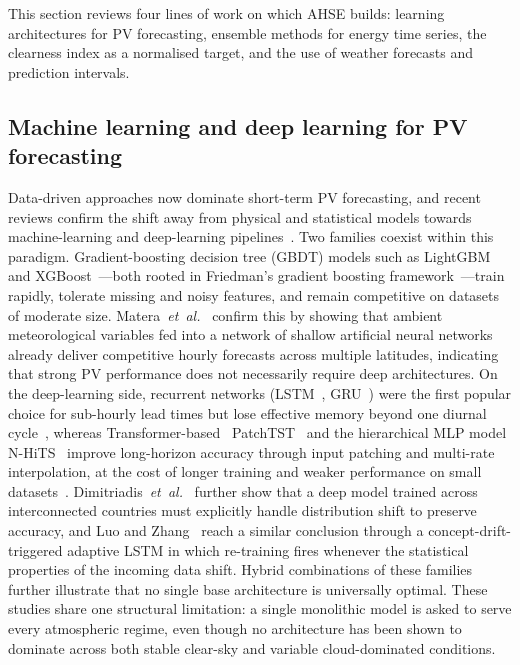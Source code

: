 
This section reviews four lines of work on which AHSE builds:
learning architectures for PV forecasting, ensemble methods for energy
time series, the clearness index as a normalised target, and the use of
weather forecasts and prediction intervals.

\subsection{Machine learning and deep learning for PV forecasting}
\label{subsec:rw_ml_dl}

Data-driven approaches now dominate short-term PV forecasting, and
recent reviews confirm the shift away from physical and statistical
models towards machine-learning and deep-learning
pipelines~\cite{gupta2025state,kumardhaked2025exploring,yu2024ref,chandel2023techniques}.
Two families coexist within this paradigm. Gradient-boosting decision
tree (GBDT) models such as LightGBM~\cite{ke2017lightgbm} and
XGBoost~\cite{chen2016xgboost}---both rooted in Friedman's gradient
boosting framework~\cite{friedman2001greedy}---train rapidly, tolerate
missing and noisy features, and remain competitive on datasets of
moderate size. Matera~\textit{et~al.}~\cite{matera2023hourly} confirm
this by showing that ambient meteorological variables fed into a
network of shallow artificial neural networks already deliver
competitive hourly forecasts across multiple latitudes, indicating that
strong PV performance does not necessarily require deep architectures.
On the deep-learning side, recurrent networks
(LSTM~\cite{hochreiter1997lstm}, GRU~\cite{cho2014gru}) were the first
popular choice for sub-hourly lead times but lose effective memory
beyond one diurnal cycle~\cite{coya2025accuracy}, whereas
Transformer-based~\cite{vaswani2017attention} PatchTST~\cite{nie2023patchtst}
and the hierarchical MLP model N-HiTS~\cite{challu2023nhits} improve
long-horizon accuracy through input patching and multi-rate
interpolation, at the cost of longer training and weaker performance
on small datasets~\cite{suresh2025benchmarking,wang2025patchtst}.
Dimitriadis~\textit{et~al.}~\cite{dimitriadis2025deep} further show
that a deep model trained across interconnected countries must
explicitly handle distribution shift to preserve accuracy, and Luo and
Zhang~\cite{luo2022adaptive} reach a similar conclusion through a
concept-drift-triggered adaptive LSTM in which re-training fires
whenever the statistical properties of the incoming data shift.
Hybrid combinations of these families~\cite{cisse2026optimized,hou2024ref,abumohsen2024combining}
further illustrate that no single base architecture is universally
optimal. These studies share one structural limitation: a single
monolithic model is asked to serve every atmospheric regime, even
though no architecture has been shown to dominate across both stable
clear-sky and variable cloud-dominated conditions.

